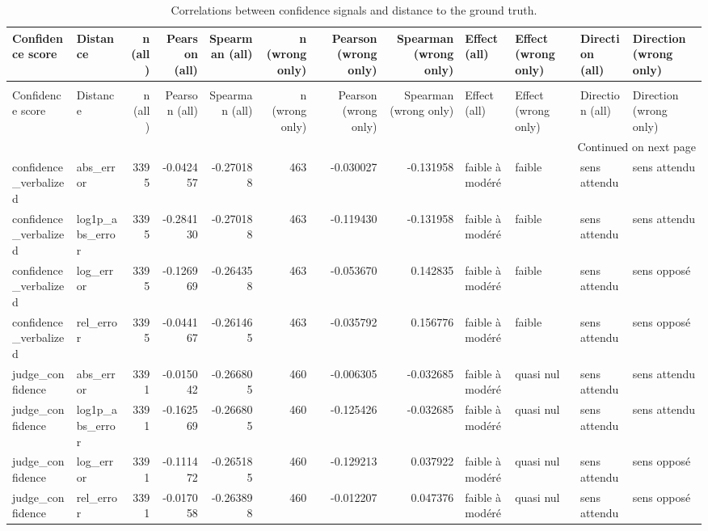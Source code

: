 \begin{longtable}{llrrrrrrllll}
\caption{Correlations between confidence signals and distance to the ground truth.} \label{tab:confidence_distance_correlations} \\
\toprule
Confidence score & Distance & n (all) & Pearson (all) & Spearman (all) & n (wrong only) & Pearson (wrong only) & Spearman (wrong only) & Effect (all) & Effect (wrong only) & Direction (all) & Direction (wrong only) \\
\midrule
\endfirsthead
\caption[]{Correlations between confidence signals and distance to the ground truth.} \\
\toprule
Confidence score & Distance & n (all) & Pearson (all) & Spearman (all) & n (wrong only) & Pearson (wrong only) & Spearman (wrong only) & Effect (all) & Effect (wrong only) & Direction (all) & Direction (wrong only) \\
\midrule
\endhead
\midrule
\multicolumn{12}{r}{Continued on next page} \\
\midrule
\endfoot
\bottomrule
\endlastfoot
confidence\_verbalized & abs\_error & 3395 & -0.042457 & -0.270188 & 463 & -0.030027 & -0.131958 & faible à modéré & faible & sens attendu & sens attendu \\
confidence\_verbalized & log1p\_abs\_error & 3395 & -0.284130 & -0.270188 & 463 & -0.119430 & -0.131958 & faible à modéré & faible & sens attendu & sens attendu \\
confidence\_verbalized & log\_error & 3395 & -0.126969 & -0.264358 & 463 & -0.053670 & 0.142835 & faible à modéré & faible & sens attendu & sens opposé \\
confidence\_verbalized & rel\_error & 3395 & -0.044167 & -0.261465 & 463 & -0.035792 & 0.156776 & faible à modéré & faible & sens attendu & sens opposé \\
judge\_confidence & abs\_error & 3391 & -0.015042 & -0.266805 & 460 & -0.006305 & -0.032685 & faible à modéré & quasi nul & sens attendu & sens attendu \\
judge\_confidence & log1p\_abs\_error & 3391 & -0.162569 & -0.266805 & 460 & -0.125426 & -0.032685 & faible à modéré & quasi nul & sens attendu & sens attendu \\
judge\_confidence & log\_error & 3391 & -0.111472 & -0.265185 & 460 & -0.129213 & 0.037922 & faible à modéré & quasi nul & sens attendu & sens opposé \\
judge\_confidence & rel\_error & 3391 & -0.017058 & -0.263898 & 460 & -0.012207 & 0.047376 & faible à modéré & quasi nul & sens attendu & sens opposé \\

\end{longtable}
